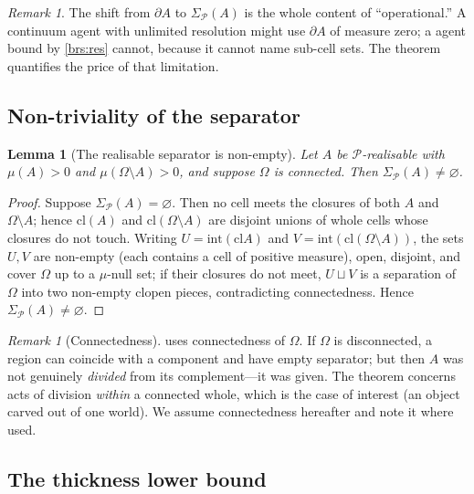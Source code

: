 \documentclass[11pt,a4paper]{article}
\theoremstyle{thmstyle}
\newtheorem{lemma}[theorem]{Lemma}
\theoremstyle{definition}
\theoremstyle{remark}
\newtheorem{remark}[theorem]{Remark}
\newcommand{\Space}{\Omega}
\newcommand{\Bdy}{\partial}
\newcommand{\interior}{\mathrm{int}}
\newcommand{\cl}{\mathrm{cl}}
\newcommand{\Part}{\mathscr{P}}
\begin{document}
\begin{remark}
The shift from $\Bdy A$ to $\Sigma_\Part(A)$ is the whole content of
``operational.'' A continuum agent with unlimited resolution might use $\Bdy A$
of measure zero; a agent bound by \ref{brs:res} cannot, because it cannot name
sub-cell sets. The theorem quantifies the price of that limitation.
\end{remark}

\subsection{Non-triviality of the separator}

\begin{lemma}[The realisable separator is non-empty]
\label{lem:nonempty-sep}
Let $A$ be $\Part$-realisable with $\mu(A)>0$ and $\mu(\Space\setminus A)>0$, and
suppose $\Space$ is connected. Then $\Sigma_\Part(A)\neq\varnothing$.
\end{lemma}

\begin{proof}
Suppose $\Sigma_\Part(A)=\varnothing$. Then no cell meets the closures of both
$A$ and $\Space\setminus A$; hence $\cl(A)$ and $\cl(\Space\setminus A)$ are
disjoint unions of whole cells whose closures do not touch. Writing
$U=\interior(\cl A)$ and $V=\interior(\cl(\Space\setminus A))$, the sets $U,V$
are non-empty (each contains a cell of positive measure), open, disjoint, and
cover $\Space$ up to a $\mu$-null set; if their closures do not meet, $U\sqcup V$
is a separation of $\Space$ into two non-empty clopen pieces, contradicting
connectedness. Hence $\Sigma_\Part(A)\neq\varnothing$.
\end{proof}

\begin{remark}[Connectedness]
 uses connectedness of $\Space$. If $\Space$ is
disconnected, a region can coincide with a component and have empty separator;
but then $A$ was not genuinely \emph{divided} from its complement---it was given.
The theorem concerns acts of division \emph{within} a connected whole, which is
the case of interest (an object carved out of one world). We assume connectedness
hereafter and note it where used.
\end{remark}

\subsection{The thickness lower bound}
\end{document}

